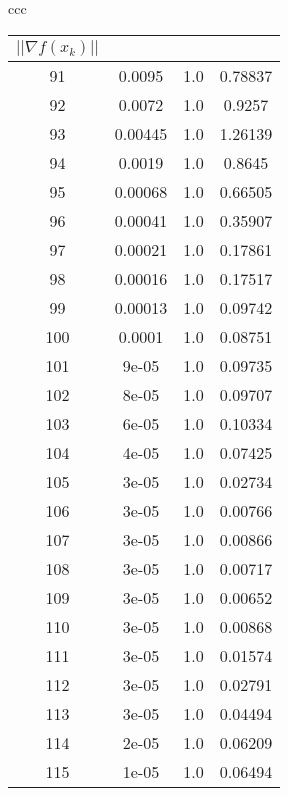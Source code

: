 \documentclass{article}
\newcommand{\norm}[1]{\left|\left|#1\right|\right|}
\begin{document}
\begin{center}
\begin{tabular}{ccc}
\begin{tabular}{|c|c|c|c|}
            $\norm{\nabla f(x_k)}$ \\
            \hline
            91 & 0.0095 & 1.0 & 0.78837 \\ 
            \hline
            92 & 0.0072 & 1.0 & 0.9257 \\ 
            \hline
            93 & 0.00445 & 1.0 & 1.26139 \\ 
            \hline
            94 & 0.0019 & 1.0 & 0.8645 \\ 
            \hline
            95 & 0.00068 & 1.0 & 0.66505 \\ 
            \hline
            96 & 0.00041 & 1.0 & 0.35907 \\ 
            \hline
            97 & 0.00021 & 1.0 & 0.17861 \\ 
            \hline
            98 & 0.00016 & 1.0 & 0.17517 \\ 
            \hline
            99 & 0.00013 & 1.0 & 0.09742 \\ 
            \hline
            100 & 0.0001 & 1.0 & 0.08751 \\ 
            \hline
            101 & 9e-05 & 1.0 & 0.09735 \\ 
            \hline
            102 & 8e-05 & 1.0 & 0.09707 \\ 
            \hline
            103 & 6e-05 & 1.0 & 0.10334 \\ 
            \hline
            104 & 4e-05 & 1.0 & 0.07425 \\ 
            \hline
            105 & 3e-05 & 1.0 & 0.02734 \\ 
            \hline
            106 & 3e-05 & 1.0 & 0.00766 \\ 
            \hline
            107 & 3e-05 & 1.0 & 0.00866 \\ 
            \hline
            108 & 3e-05 & 1.0 & 0.00717 \\ 
            \hline
            109 & 3e-05 & 1.0 & 0.00652 \\ 
            \hline
            110 & 3e-05 & 1.0 & 0.00868 \\ 
            \hline
            111 & 3e-05 & 1.0 & 0.01574 \\ 
            \hline
            112 & 3e-05 & 1.0 & 0.02791 \\ 
            \hline
            113 & 3e-05 & 1.0 & 0.04494 \\ 
            \hline
            114 & 2e-05 & 1.0 & 0.06209 \\ 
            \hline
            115 & 1e-05 & 1.0 & 0.06494 \\ 

\end{tabular}
\end{tabular}
\end{center}
\end{document}
